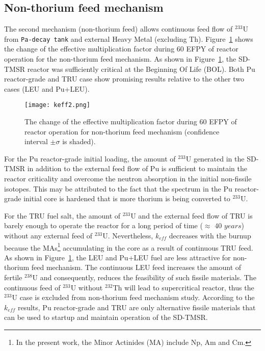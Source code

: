 \subsection{Non-thorium feed mechanism}

The second mechanism (non-thorium feed) allows continuous feed flow of 
$^{233}$U from \texttt{Pa-decay tank} and external Heavy Metal (excluding Th). 
Figure~\ref{fig:keff2} shows the change of the effective multiplication factor 
during 60 \gls{EFPY} of reactor operation for the non-thorium feed mechanism.
As shown in Figure~\ref{fig:keff2}, the \gls{SD-TMSR} reactor was sufficiently 
critical at the Beginning Of Life (BOL). Both Pu reactor-grade and TRU case 
show promising results relative to the other two cases (LEU and Pu+LEU). 
\begin{figure}
	\centering
	\texttt{[image: keff2.png]}
			\vspace{-0.5in}
	\caption{The change of the effective multiplication factor during 60 
	\gls{EFPY} of reactor operation for non-thorium feed mechanism (confidence 
	interval $\pm\sigma$ is shaded).} 
	\label{fig:keff2}
\end{figure}

For the Pu reactor-grade initial loading, the amount of $^{233}$U generated in 
the \gls{SD-TMSR} in addition to the external feed flow of Pu is sufficient to 
maintain the reactor criticality and overcome the neutron absorption in the 
initial non-fissile isotopes. This may be attributed to the fact that the 
spectrum in the Pu reactor-grade initial core is hardened that is more thorium 
is being converted to $^{233}$U. 

For the \gls{TRU} fuel salt, the amount of 
$^{233}$U and the external feed flow of TRU is barely enough to operate the 
reactor for a long period of time ($\approx$ $40$ $years$) without any 
external feed of $^{233}$U. Nevertheless, $k_{eff}$ decreases with the burnup 
because the \glspl{MA}\footnote{In the present work, the Minor Actinides 
(MA) include Np, Am and Cm.} accumulating in the core as a result of 
continuous TRU feed. As shown in Figure~\ref{fig:keff2}, the LEU and Pu+LEU 
fuel are less attractive for non-thorium feed mechanism. The continuous LEU 
feed increases the amount of fertile $^{238}$U and consequently, reduces the 
feasibility of such fissile materials. The continuous feed of $^{233}$U 
without $^{232}$Th will lead to supercritical reactor, thus the $^{233}$U case 
is excluded from non-thorium feed mechanism study. According to the $k_{eff}$ 
results, Pu reactor-grade and TRU are only alternative fissile materials that  
can be used to startup and maintain operation of the \gls{SD-TMSR}.


